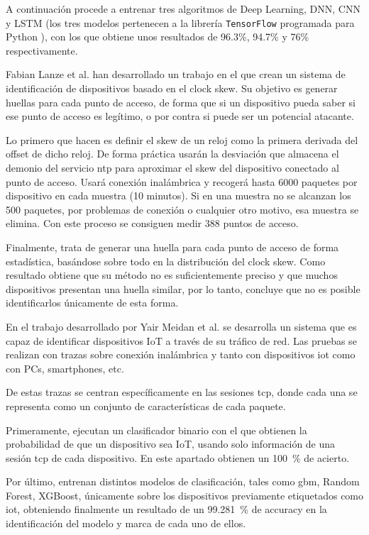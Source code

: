 A continuación procede a entrenar tres algoritmos de Deep Learning, DNN, CNN y LSTM (los tres modelos pertenecen a la librería \texttt{TensorFlow} programada para Python \cite{tensorflow2015-whitepaper}), con los que obtiene unos resultados de 96.3\%, 94.7\% y 76\% respectivamente.

Fabian Lanze et al. \cite{lanze2012clock} han desarrollado un trabajo en el que crean un sistema de identificación de dispositivos basado en el clock skew. Su objetivo es generar huellas para cada punto de acceso, de forma que si un dispositivo pueda saber si ese punto de acceso es legítimo, o por contra si puede ser un potencial atacante.

Lo primero que hacen es definir el skew de un reloj como la primera derivada del offset de dicho reloj. De forma práctica usarán la desviación que almacena el demonio del servicio \acrshort{ntp} para aproximar el skew del dispositivo conectado al punto de acceso. Usará conexión inalámbrica y recogerá hasta 6000 paquetes por dispositivo en cada muestra (10 minutos). Si en una muestra no se alcanzan los 500 paquetes, por problemas de conexión o cualquier otro motivo, esa muestra se elimina. Con este proceso se consiguen medir 388 puntos de acceso. 

Finalmente, trata de generar una huella para cada punto de acceso de forma estadística, basándose sobre todo en la distribución del clock skew. Como resultado obtiene que su método no es suficientemente preciso y que muchos dispositivos presentan una huella similar, por lo tanto, concluye que no es posible identificarlos únicamente de esta forma.

En el trabajo desarrollado por Yair Meidan et al. \cite{meidan2017profiliot} se desarrolla un sistema que es capaz de identificar dispositivos IoT a través de su tráfico de red. Las pruebas se realizan con trazas sobre conexión inalámbrica y tanto con dispositivos \acrshort{iot} como con PCs, smartphones, etc. 

De estas trazas se centran específicamente en las sesiones \acrshort{tcp}, donde cada una se representa como un conjunto de características de cada paquete.

Primeramente, ejecutan un clasificador binario con el que obtienen la probabilidad de que un dispositivo sea IoT, usando solo información de una sesión \acrshort{tcp} de cada dispositivo. En este apartado obtienen un \SI{100}{\percent} de acierto.

Por último, entrenan distintos modelos de clasificación, tales como \acrfull{gbm}, Random Forest, XGBoost, únicamente sobre los dispositivos previamente etiquetados como \acrshort{iot}, obteniendo finalmente un resultado de un \SI{99.281}{\percent} de accuracy en la identificación del modelo y marca de cada uno de ellos.

